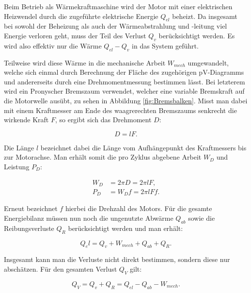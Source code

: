 \documentclass{article}
\begin{document}
Beim Betrieb als Wärmekraftmaschine wird der Motor mit einer elektrischen Heizwendel durch die zugeführte elektrische Energie $Q_{el}$ beheizt. Da insgesamt bei sowohl der Beheizung als auch der Wärmeabstrahlung und -leitung viel Energie verloren geht, muss der Teil des Verlust $Q_v$ berücksichtigt werden. Es wird also effektiv nur die Wärme $Q_{el} - Q_v$ in das System geführt. 

Teilweise wird diese Wärme in die mechanische Arbeit $W_{mech}$ umgewandelt, welche sich einmal durch Berechnung der Fläche des zugehörigen pV-Diagramms und andererseits durch eine Drehmomentmessung bestimmen lässt. Bei letzterem wird ein Pronyscher Bremszaum verwendet, welcher eine variable Bremskraft auf die Motorwelle ausübt, zu sehen in Abbildung \ref{fig:Bremsbalken}. Misst man dabei mit einem Kraftmesser am Ende des waagrerechten Bremszaums senkrecht die wirkende Kraft $F$, so ergibt sich das Drehmoment $D$:

\begin{equation}
    D = l F.
\end{equation}

Die Länge $l$ bezeichnet dabei die Länge vom Aufhängepunkt des Kraftmessers bis zur Motorachse. Man erhält somit die pro Zyklus abgebene Arbeit $W_D$ und Leistung $P_D$:

\begin{equation}
    \begin{split}
        W_D &= 2 \pi D = 2 \pi l F, \\
        P_D &= W_D f = 2 \pi l F f.
    \end{split}
    \label{eq:Wärmekraftmaschine-W_D&P_D}
\end{equation}

Erneut bezeichnet $f$ hierbei die Drehzahl des Motors. Für die gesamte Energiebilanz müssen nun noch die ungenutzte Abwärme $Q_{ab}$ sowie die Reibungsverluste $Q_R$ berücksichtigt werden und man erhält:

\begin{equation}
    Q_el = Q_v + W_{mech} + Q_{ab} + Q_R.
    \label{eq:Wärmekraftmaschine-Energiebilanz}
\end{equation}

Insgesamt kann man die Verluste nicht direkt bestimmen, sondern diese nur abschätzen. Für den gesamten Verlust $Q_V$ gilt:

\begin{equation}
    Q_V = Q_v + Q_R = Q_{el} - Q_{ab} - W_{mech}.
    \label{eq:Wärmekraftmaschine-Verlust}
\end{equation}
\end{document}
